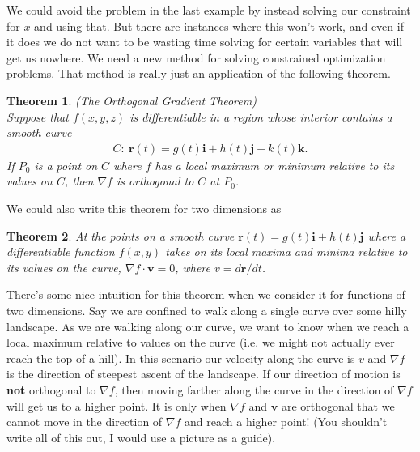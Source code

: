 \documentclass[12pt, letter]{article}
\theoremstyle{plain}
\newtheorem{theorem}{Theorem}
\numberwithin{theorem}{section}
\theoremstyle{definition}
\begin{document}
\bigskip

\hrulefill

\bigskip

We could avoid the problem in the last example by instead solving our constraint for $x$ and using that. But there are instances where this won't work, and even if it does we do not want to be wasting time solving for certain variables that will get us nowhere. We need a new method for solving constrained optimization problems. That method is really just an application of the following theorem.

\bigskip

\begin{theorem}{(The Orthogonal Gradient Theorem)}
\\
Suppose that $f(x,y,z)$ is differentiable in a region whose interior contains a smooth curve
\begin{align*}
C: \ \bm{r}(t) = g(t)\bm{i}+h(t)\bm{j}+k(t)\bm{k}.
\end{align*}
If $P_0$ is a point on $C$ where $f$ has a local maximum or minimum relative to its values on $C$, then $\nabla f$ is orthogonal to $C$ at $P_0$.
\end{theorem}

\bigskip

We could also write this theorem for two dimensions as

\bigskip

\begin{theorem}
At the points on a smooth curve $\bm{r}(t) = g(t)\bm{i}+h(t)\bm{j}$ where a differentiable function $f(x,y)$ takes on its local maxima and minima relative to its values on the curve, $\nabla f \cdot \bm{v} = 0$, where $v=d\bm{r}/dt$.
\end{theorem}

\bigskip

\hrulefill

\bigskip

There's some nice intuition for this theorem when we consider it for functions of two dimensions. Say we are confined to walk along a single curve over some hilly landscape. As we are walking along our curve, we want to know when we reach a local maximum relative to values on the curve (i.e. we might not actually ever reach the top of a hill). In this scenario our velocity along the curve is $v$ and $\nabla f$ is the direction of steepest ascent of the landscape. If our direction of motion is \textbf{not} orthogonal to $\nabla f$, then moving farther along the curve in the direction of $\nabla f$ will get us to a higher point. It is only when $\nabla f$ and $\bm{v}$ are orthogonal that we cannot move in the direction of $\nabla f$ and reach a higher point! (You shouldn't write all of this out, I would use a picture as a guide).
\end{document}
